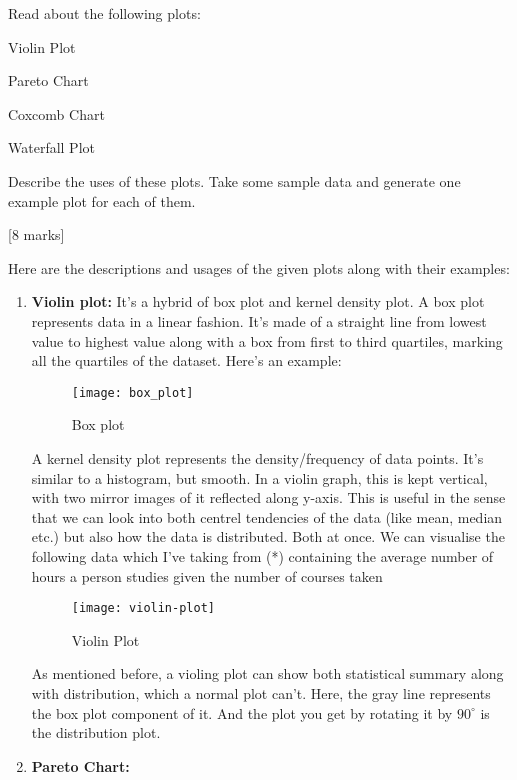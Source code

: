 \begin{que}
	Read about the following plots:
	\begin{enumerate}
		{\color{red}
		\item Violin Plot
		\item Pareto Chart
		\item Coxcomb Chart
		\item Waterfall Plot
		      }
	\end{enumerate}
	Describe the uses of these plots. Take some sample data and generate one example plot
	for each of them.

	\hspace*{\fill} [8 marks]
\end{que}

\begin{tcolorbox}[breakable]
	\begin{sol}
		Here are the descriptions and usages of the given plots along with their examples:
		\begin{enumerate}
			\item \textbf{Violin plot:} It's a hybrid of box plot and kernel density plot.
			      A box plot represents data in a linear fashion. It's made of a straight line
			      from lowest value to highest value along with a box from first to third
			      quartiles, marking all the quartiles of the dataset. Here's an example:
			      \begin{figure}[H]
				      \centering
				      \texttt{[image: box\_plot]}
				      \caption{Box plot}
				      \label{fig:box}
			      \end{figure}
			      A kernel density plot represents the density/frequency of data points. It's
			      similar to a histogram, but smooth. In a violin graph, this is kept vertical,
			      with two mirror images of it reflected along y-axis. This is useful in the
			      sense that we can look into both centrel tendencies of the data (like mean,
			      median etc.) but also how the data is distributed. Both at once. We can
			      visualise the following data which I've taking from (*) containing the average
			      number of hours a person studies given the number of courses taken
			      \begin{figure}[H]
				      \centering
				      \texttt{[image: violin-plot]}
				      \caption{Violin Plot}
				      \label{fig:violin}
			      \end{figure}
			      As mentioned before, a violing plot can show both statistical summary along
			      with distribution, which a normal plot can't. Here, the gray line represents
			      the box plot component of it. And the plot you get by rotating it by $90^\circ$
			      is the distribution plot.
			\item \textbf{Pareto Chart:}
		\end{enumerate}
	\end{sol}
\end{tcolorbox}
